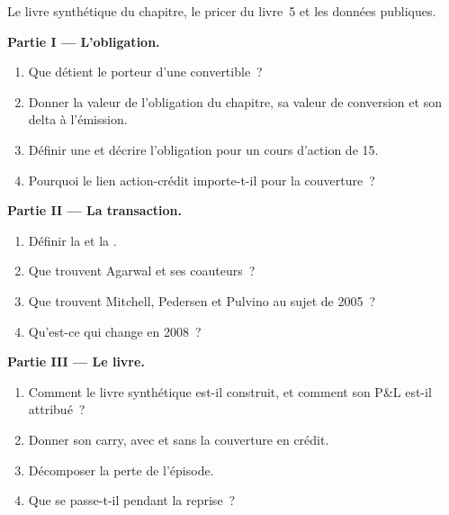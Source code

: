 \begin{problem}\label{pb:s2:convertible-arbitrage:1}
Le livre synthétique du chapitre, le pricer du livre~5 et les données publiques.

\medskip\noindent\textbf{Partie I --- L'obligation.}
\begin{enumerate}
\item Que détient le porteur d'une convertible~?
\item Donner la valeur de l'obligation du chapitre, sa valeur de conversion et son delta à l'émission.
\item Définir une  et décrire l'obligation pour un cours d'action de 15.
\item Pourquoi le lien action-crédit importe-t-il pour la couverture~?
\end{enumerate}

\medskip\noindent\textbf{Partie II --- La transaction.}
\begin{enumerate}[resume]
\item Définir la  et la .
\item Que trouvent Agarwal et ses coauteurs~?
\item Que trouvent Mitchell, Pedersen et Pulvino au sujet de 2005~?
\item Qu'est-ce qui change en 2008~?
\end{enumerate}

\medskip\noindent\textbf{Partie III --- Le livre.}
\begin{enumerate}[resume]
\item Comment le livre synthétique est-il construit, et comment son P\&L est-il attribué~?
\item Donner son carry, avec et sans la couverture en crédit.
\item Décomposer la perte de l'épisode.
\item Que se passe-t-il pendant la reprise~?
\end{enumerate}


\end{problem}

